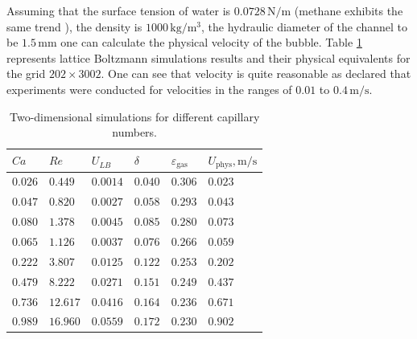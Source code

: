 \documentclass{article}
\begin{document}
Assuming that the surface tension of water is $0.0728\,\mathrm{N/m}$ (methane exhibits the same
trend \cite{schmidt-methane}), the density is       
$1000\,\mathrm{kg/m^3}$, the hydraulic diameter of the channel to be $1.5\,\mathrm{mm}$ one can
calculate the physical velocity of the bubble.
Table \ref{table:twod:simulations} represents lattice Boltzmann simulations results and their
physical equivalents for the grid $202\times 3002$. One can see
that velocity is quite reasonable
as \citet{bercic-mass} declared that experiments were conducted for velocities in the ranges of
$0.01$ to $0.4\,\mathrm{m}/\mathrm{s}$. 
\begin{table}
\begin{tabularx}{\textwidth}{|X|X|X|X|X|X|}
\hline
$Ca$    &$Re$     &$U_{LB}$ &$\delta$&$\varepsilon_{\mathrm{gas}}$
&$U_{\mathrm{phys}}, \mathrm{m/s}$\\
\hline
$0.026$ &$0.449$  &$0.0014$ &$0.040$ &$0.306$ &$0.023$   \\ 
$0.047$ &$0.820$  &$0.0027$ &$0.058$ &$0.293$ &$0.043$   \\ 
$0.080$ &$1.378$  &$0.0045$ &$0.085$ &$0.280$ &$0.073$ \\
$0.065$ &$1.126$  &$0.0037$ &$0.076$ &$0.266$ &$0.059$      \\
$0.222$ &$3.807$  &$0.0125$ &$0.122$ &$0.253$ &$0.202$  \\
$0.479$ &$8.222$  &$0.0271$ &$0.151$ &$0.249$ &$0.437$  \\
$0.736$ &$12.617$ &$0.0416$ &$0.164$ &$0.236$ &$0.671$  \\ 
$0.989$ &$16.960$ &$0.0559$ &$0.172$ &$0.230$ &$0.902$  \\
\hline
\end{tabularx}
\caption{Two-dimensional simulations for different
capillary numbers. \label{table:twod:simulations}}
\end{table}
\end{document}
